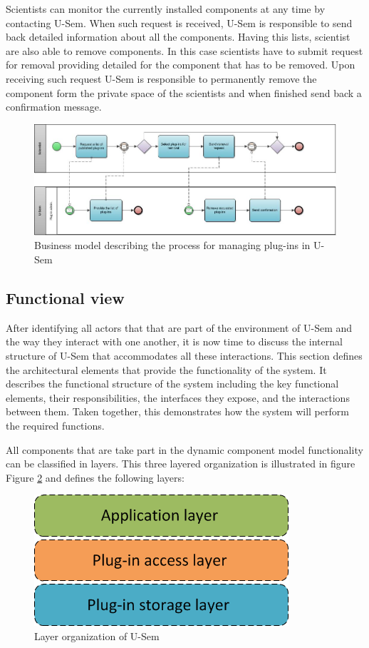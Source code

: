 Scientists can monitor the currently installed components at any time by contacting U-Sem. When such request is received, U-Sem is responsible to send back detailed information about all the components. Having this lists, scientist are also able to remove components. In this case scientists have to submit request for removal providing detailed for the component that has to be removed. Upon receiving such request U-Sem is responsible to permanently remove the component form the private space of the scientists and when finished send back a confirmation message.

\begin{figure}[h!]
  \centering
  	\includegraphics[scale=0.6]{plug-in/business_processes/PluginManagementBusinessModel.jpg}
  \caption{Business model describing the process for managing plug-ins in U-Sem}
  \label{fig_admin_bpm}
\end{figure}


\subsection{Functional view}

After identifying all actors that that are part of the environment of U-Sem and the way they interact with one another, it is now time to discuss the internal structure of U-Sem that accommodates all these interactions. This section defines the architectural elements that provide the functionality of the system. It describes the functional structure of the system including the key functional elements, their responsibilities, the interfaces they expose, and the interactions between them. Taken together, this demonstrates how the system will perform the required functions.

All components that are take part in the dynamic component model functionality can be classified in layers. This three layered organization is illustrated in figure Figure \ref{fig_layer} and defines the following layers:

\begin{figure}[h!]
  \centering
  	\includegraphics[scale=0.6]{plug-in/layers/layers.png}
  \caption{Layer organization of U-Sem}
  \label{fig_layer}
\end{figure}

